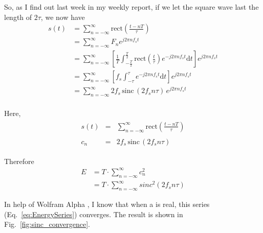 \documentclass{article}
\begin{document}
So, as I find out last week in my weekly report, if we let the square wave last the length of $2\tau$, we now have
\begin{equation}
    \begin{aligned} s(t) & = \sum_{n = -\infty}^{\infty} \mathrm{rect} (\frac{t - nT}{\tau}) \\
             & = \sum_{n =-\infty}^{\infty}F_n e^{j2 \pi n f_s t}  \\
             & = \sum_{n = -\infty}^{\infty}\left[ \frac{1}{T} \int_{-\frac T2}^{\frac T2}
              \mathrm{rect}(\frac{t}{\tau}) e^{-j2 \pi n f_s t} \mathrm{d}t \right] e^{j2 \pi n f_s t} \\
             & = \sum_{n = -\infty}^{\infty}\left[ f_s \int_{-\tau}^{\tau} e^{-j2 \pi n f_s t} \mathrm{d}t \right] e^{j2 \pi n f_s t}  \\
             & = \sum_{n = -\infty}^{\infty}2f_s\, \mathrm{sinc} \,( 2f_s n\tau)\, e^{j2 \pi n f_s t} \\
             \label{eq:samplingSquare}
    \end{aligned}
\end{equation}

Here, 
\begin{align*}
\begin{array}{lrl}
s(t) &=& \sum\limits_{n = -\infty}^{\infty} \mathrm{rect} (\frac{t - nT}{\tau}) \\ \\
c_n  &=& 2f_s\, \mathrm{sinc} \,( 2f_s n\tau)
\end{array}
\end{align*}  


Therefore
\begin{equation}
\begin{aligned}
E &= T \cdot \sum_{n = -\infty}^{\infty} c_n^2 \\ 
&= T \cdot \sum_{n = -\infty}^{\infty} sinc^2(2f_sn\tau)
\end{aligned}
\label{eq:EnergySeries}
\end{equation}

\newpage

In help of Wolfram Alpha \cite{sinc_convergence}, I know that when a is real, this series (Eq.~\ref{eq:EnergySeries}) converges. 
The result is shown in Fig.~\ref{fig:sinc_convergence}.
\end{document}
